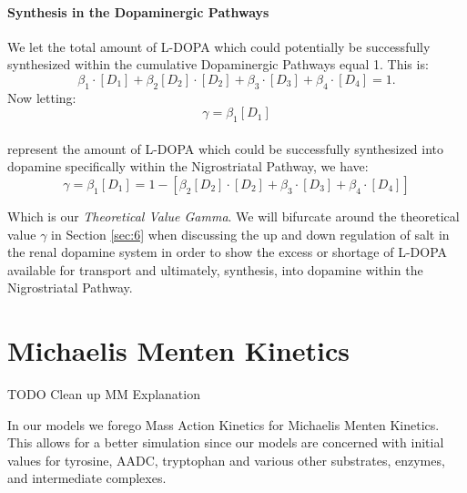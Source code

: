 \documentclass[smallextended]{svjour3}
\newcommand{\todo}[1]{{\huge\color{red}TODO {#1}}}
\begin{document}
\paragraph{Synthesis in the Dopaminergic Pathways} \hfill

We let the total amount of L-DOPA which could potentially be successfully synthesized within the cumulative Dopaminergic Pathways equal 1.
  This is:
$$\beta_1 \cdot [D_1] + \beta_2[D_2] \cdot [D_2] + \beta_3 \cdot [D_3] + \beta_4 \cdot [D_4] = 1.$$
  Now letting: $$\gamma =\beta_1[D_1]$$ \\ represent the amount of L-DOPA which could be successfully synthesized into dopamine specifically within the Nigrostriatal Pathway, we have: 
\begin{equation}
 \label{eq:5}
  \gamma = \beta_1[D_1] = 1- [\beta_2[D_2] \cdot [D_2] + \beta_3 \cdot [D_3] + \beta_4 \cdot [D_4]]
  \end{equation}

Which is our \textit{Theoretical Value Gamma}.  We will bifurcate around the theoretical value  $\gamma$ in Section \ref{sec:6} when discussing the up and down regulation of salt in the renal dopamine system in order to show the excess or shortage of L-DOPA available for transport and ultimately, synthesis, into dopamine within the Nigrostriatal Pathway.

\section{ Michaelis Menten Kinetics}
\label{sec:3}
\todo{Clean up MM Explanation}

In our models we forego Mass Action Kinetics for Michaelis Menten Kinetics.  This allows for a better simulation since our models are concerned with initial values for tyrosine, AADC, tryptophan and various other substrates, enzymes, and intermediate complexes.
\end{document}
